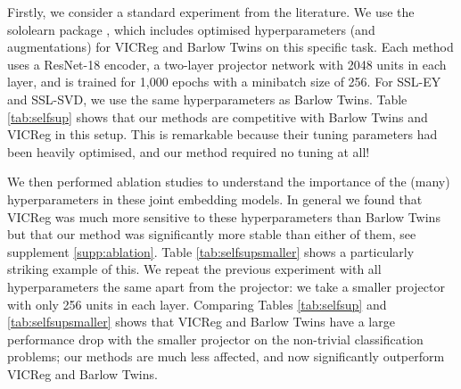 Firstly, we consider a standard experiment from the literature.
We use the sololearn package \cite{da2022solo}, which includes optimised hyperparameters (and augmentations) for VICReg and Barlow Twins on this specific task.
Each method uses a ResNet-18 encoder, a two-layer projector network with 2048 units in each layer, and is trained for 1,000 epochs with a minibatch size of 256.
For SSL-EY and SSL-SVD, we use the same hyperparameters as Barlow Twins.  
Table \ref{tab:selfsup} shows that our methods are competitive with Barlow Twins and VICReg in this setup.
This is remarkable because their tuning parameters had been heavily optimised, and our method required no tuning at all!

We then performed ablation studies to understand the importance of the (many) hyperparameters in these joint embedding models. In general we found that VICReg was much more sensitive to these hyperparameters than Barlow Twins but that our method was significantly more stable than either of them, see supplement \ref{supp:ablation}.
Table \ref{tab:selfsupsmaller} shows a particularly striking example of this. 
We repeat the previous experiment with all hyperparameters the same apart from the projector: we take a smaller projector with only 256 units in each layer. 
Comparing Tables \ref{tab:selfsup} and \ref{tab:selfsupsmaller} shows that VICReg and Barlow Twins have a large performance drop with the smaller projector on the non-trivial classification problems; our methods are much less affected, and now significantly outperform VICReg and Barlow Twins.





